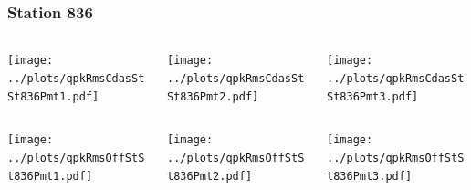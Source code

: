 \documentclass[aspectratio=169]{beamer}
\begin{document}
\begin{frame} 
  \frametitle{Station 836}
  \begin{center}
    \begin{columns}
      \begin{column}{0.33\textwidth}
        \texttt{[image: ../plots/qpkRmsCdasStSt836Pmt1.pdf]}
      \end{column}
      \begin{column}{0.33\textwidth}
        \texttt{[image: ../plots/qpkRmsCdasStSt836Pmt2.pdf]}
      \end{column}
      \begin{column}{0.33\textwidth}
        \texttt{[image: ../plots/qpkRmsCdasStSt836Pmt3.pdf]}
      \end{column}
    \end{columns}
  \end{center}

  \begin{center}
    \begin{columns}
      \begin{column}{0.33\textwidth}
        \texttt{[image: ../plots/qpkRmsOffStSt836Pmt1.pdf]}
      \end{column}
      \begin{column}{0.33\textwidth}
        \texttt{[image: ../plots/qpkRmsOffStSt836Pmt2.pdf]}
      \end{column}
      \begin{column}{0.33\textwidth}
        \texttt{[image: ../plots/qpkRmsOffStSt836Pmt3.pdf]}
      \end{column}
    \end{columns}
  \end{center}
\end{frame}
\end{document}
